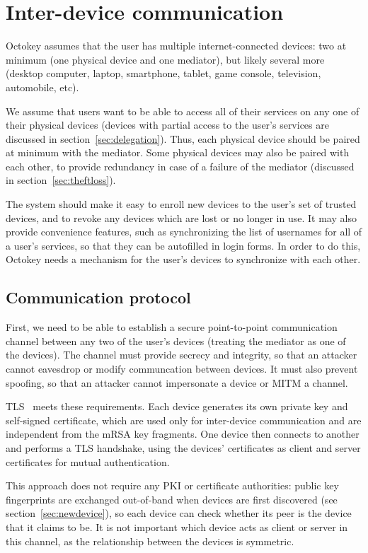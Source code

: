 \section{Inter-device communication}\label{sec:interdevice}

Octokey assumes that the user has multiple internet-connected devices: two at minimum (one physical
device and one mediator), but likely several more (desktop computer, laptop, smartphone, tablet,
game console, television, automobile, etc).

We assume that users want to be able to access all of their services on any one of their physical
devices (devices with partial access to the user's services are discussed in
section~\ref{sec:delegation}). Thus, each physical device should be paired at minimum with the
mediator. Some physical devices may also be paired with each other, to provide redundancy in case of
a failure of the mediator (discussed in section~\ref{sec:theftloss}).

The system should make it easy to enroll new devices to the user's set of trusted devices, and to
revoke any devices which are lost or no longer in use. It may also provide convenience features,
such as synchronizing the list of usernames for all of a user's services, so that they can be
autofilled in login forms. In order to do this, Octokey needs a mechanism for the user's devices to
synchronize with each other.

\subsection{Communication protocol}\label{sec:channels}

First, we need to be able to establish a secure point-to-point communication channel between any two
of the user's devices (treating the mediator as one of the devices). The channel must provide
secrecy and integrity, so that an attacker cannot eavesdrop or modify communcation between devices.
It must also prevent spoofing, so that an attacker cannot impersonate a device or MITM a channel.

TLS~\cite{TLS} meets these requirements. Each device generates its own private key and self-signed
certificate, which are used only for inter-device communication and are independent from the mRSA
key fragments. One device then connects to another and performs a TLS handshake, using the devices'
certificates as client and server certificates for mutual authentication.

This approach does not require any PKI or certificate authorities: public key fingerprints are
exchanged out-of-band when devices are first discovered (see section~\ref{sec:newdevice}), so each
device can check whether its peer is the device that it claims to be. It is not important which
device acts as client or server in this channel, as the relationship between the devices is
symmetric.


